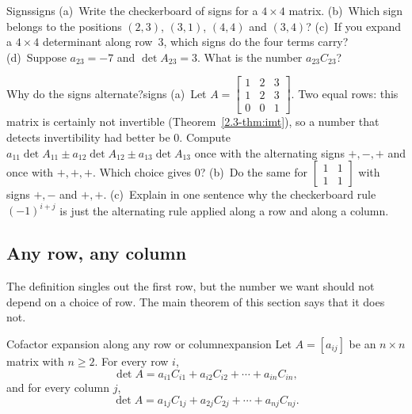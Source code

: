 \documentclass[11pt]{article}
\begin{document}
\begin{kc}{Signs}{signs}
(a)~Write the checkerboard of signs for a $4\times4$ matrix. (b)~Which sign belongs to the positions $(2,3)$, $(3,1)$, $(4,4)$ and $(3,4)$? (c)~If you expand a $4\times4$ determinant along row~$3$, which signs do the four terms carry? (d)~Suppose $a_{23}=-7$ and $\det A_{23}=3$. What is the number $a_{23}C_{23}$?
\end{kc}

\begin{think}{Why do the signs alternate?}{signs}
(a)~Let $A=\begin{bmatrix}1&2&3\\1&2&3\\0&0&1\end{bmatrix}$. Two equal rows: this matrix is certainly not invertible (Theorem~\ref{2.3-thm:imt}), so a number that detects invertibility had better be $0$. Compute $a_{11}\det A_{11}\pm a_{12}\det A_{12}\pm a_{13}\det A_{13}$ once with the alternating signs $+,-,+$ and once with $+,+,+$. Which choice gives $0$? (b)~Do the same for $\begin{bmatrix}1&1\\1&1\end{bmatrix}$ with signs $+,-$ and $+,+$. (c)~Explain in one sentence why the checkerboard rule $(-1)^{i+j}$ is just the alternating rule applied along a row and along a column.
\end{think}

\subsection*{Any row, any column}

The definition singles out the first row, but the number we want should not depend on a choice of row. The main theorem of this section says that it does not.

\begin{thm}{Cofactor expansion along any row or column}{expansion}
Let $A=[a_{ij}]$ be an $n\times n$ matrix with $n\geq2$. For every row $i$,
\[
\det A=a_{i1}C_{i1}+a_{i2}C_{i2}+\cdots+a_{in}C_{in},
\]
and for every column $j$,
\[
\det A=a_{1j}C_{1j}+a_{2j}C_{2j}+\cdots+a_{nj}C_{nj}.
\]
\end{thm}
\end{document}
